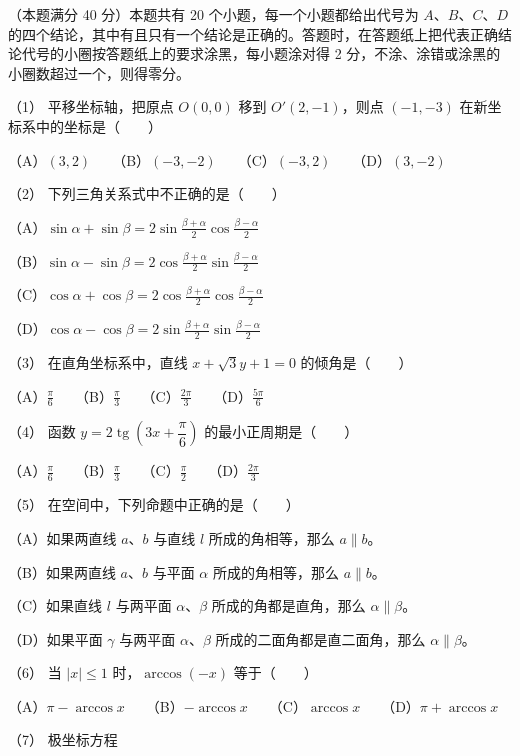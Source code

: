 \begin{question}
（本题满分 40 分）本题共有 20 个小题，每一个小题都给出代号为 $A\text{、}B\text{、}C\text{、}D$ 的四个结论，其中有且只有一个结论是正确的。答题时，在答题纸上把代表正确结论代号的小圈按答题纸上的要求涂黑，每小题涂对得 2 分，不涂、涂错或涂黑的小圈数超过一个，则得零分。

（1） 平移坐标轴，把原点 $O(0,0)$ 移到 $O'(2,-1)$，则点 $(-1,-3)$ 在新坐标系中的坐标是\mbox{（　　）}

（A）$(3,2)$　　（B）$(-3,-2)$　　（C）$(-3,2)$　　（D）$(3,-2)$

（2） 下列三角关系式中不正确的是\mbox{（　　）}

（A）$\sin\alpha+\sin\beta=2\sin\frac{\beta+\alpha}{2}\cos\frac{\beta-\alpha}{2}$

（B）$\sin\alpha-\sin\beta=2\cos\frac{\beta+\alpha}{2}\sin\frac{\beta-\alpha}{2}$

（C）$\cos\alpha+\cos\beta=2\cos\frac{\beta+\alpha}{2}\cos\frac{\beta-\alpha}{2}$

（D）$\cos\alpha-\cos\beta=2\sin\frac{\beta+\alpha}{2}\sin\frac{\beta-\alpha}{2}$

（3） 在直角坐标系中，直线 $x+\sqrt3y+1=0$ 的倾角是\mbox{（　　）}

（A）$\frac\pi6$　　（B）$\frac\pi3$　　（C）$\frac{2\pi}3$　　（D）$\frac{5\pi}6$

（4） 函数 $y=2\operatorname{tg}\left(3x+\dfrac\pi6\right)$ 的最小正周期是\mbox{（　　）}

（A）$\frac\pi6$　　（B）$\frac\pi3$　　（C）$\frac\pi2$　　（D）$\frac{2\pi}3$

（5） 在空间中，下列命题中正确的是\mbox{（　　）}

（A）如果两直线 $a\text{、}b$ 与直线 $l$ 所成的角相等，那么 $a\parallel b$。

（B）如果两直线 $a\text{、}b$ 与平面 $\alpha$ 所成的角相等，那么 $a\parallel b$。

（C）如果直线 $l$ 与两平面 $\alpha\text{、}\beta$ 所成的角都是直角，那么 $\alpha\parallel\beta$。

（D）如果平面 $\gamma$ 与两平面 $\alpha\text{、}\beta$ 所成的二面角都是直二面角，那么 $\alpha\parallel\beta$。

（6） 当 $|x|\le1$ 时，$\arccos(-x)$ 等于\mbox{（　　）}

（A）$\pi-\arccos x$　　（B）$-\arccos x$　　（C）$\arccos x$　　（D）$\pi+\arccos x$

（7） 极坐标方程


\end{question}
